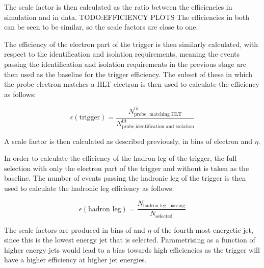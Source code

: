 The scale factor is then calculated as the ratio between the efficiencies in simulation and in data.
TODO:EFFICIENCY PLOTS %
The efficiencies in both can be seen to be similar, so the scale factors are close to one.

The efficiency of the electron part of the trigger is then similarly calculated, with respect to the
identification and isolation requirements, meaning the events passing the identification and isolation
requirements in the previous stage are then used as the baseline for the trigger efficiency. The subset of
these in which the probe electron matches a HLT electron is then used to calculate the efficiency as follows:

\begin{equation}
\epsilon(\text{trigger}) = \frac{N^{\text{fit}}_{\text{probe, matching HLT}}}{N^{\text{fit}}_{\text{probe,identification and isolation}}}
\end{equation}

A scale factor is then calculated as described previously, in bins of electron \pt and $\eta$.

In order to calculate the efficiency of the hadron leg of the trigger, the full selection with only the
electron part of the trigger and without \btagging is taken as the baseline. The number of events passing the
hadronic leg of the trigger is then used to calculate the hadronic leg efficiency as follows:

\begin{equation}
\epsilon(\text{hadron leg}) = \frac{N_{\text{hadron leg, passing}}}{N_{\text{selected}}}
\end{equation}

The scale factors are produced in bins of \pt and $\eta$ of the fourth most energetic jet, since this is the
lowest energy jet that is selected. Parametrising as a function of higher energy jets would lead to a bias
towards high efficiencies as the trigger will have a higher efficiency at higher jet energies.
